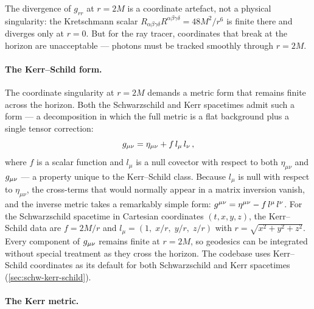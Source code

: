 The divergence of $g_{rr}$ at $r = 2M$ is a coordinate artefact, not
a physical singularity: the Kretschmann scalar
$R_{\alpha\beta\gamma\delta}R^{\alpha\beta\gamma\delta} = 48M^2/r^6$
is finite there and diverges only at $r = 0$.  But for the ray tracer,
coordinates that break at the horizon are unacceptable --- photons
must be tracked smoothly through $r = 2M$.

\paragraph{The Kerr--Schild form.}

The coordinate singularity at $r = 2M$ demands a metric form that
remains finite across the horizon.  Both the Schwarzschild and Kerr
spacetimes admit such a form --- a decomposition in which the full
metric is a flat background plus a single tensor correction:
%
\begin{equation}
  g_{\mu\nu} = \eta_{\mu\nu} + f\,l_\mu\,l_\nu \,,
  \label{eq:kerr-schild-form}
\end{equation}
%
where $f$ is a scalar function and $l_\mu$ is a null covector with
respect to both $\eta_{\mu\nu}$ and $g_{\mu\nu}$ --- a property unique
to the Kerr--Schild class.  Because $l_\mu$ is null with respect to
$\eta_{\mu\nu}$, the cross-terms that would normally appear in a
matrix inversion vanish, and the inverse metric takes a remarkably
simple form: $g^{\mu\nu} = \eta^{\mu\nu} - f\,l^\mu\,l^\nu$.
For the Schwarzschild spacetime in Cartesian coordinates
$(t, x, y, z)$, the Kerr--Schild data are $f = 2M/r$ and
$l_\mu = (1,\; x/r,\; y/r,\; z/r)$ with $r = \sqrt{x^2 + y^2 + z^2}$.
Every component of $g_{\mu\nu}$ remains finite at $r = 2M$, so geodesics
can be integrated without special treatment as they cross the horizon.
The codebase uses Kerr--Schild coordinates as its default for both
Schwarzschild and Kerr spacetimes (\cref{sec:schw-kerr-schild}).

\paragraph{The Kerr metric.}

